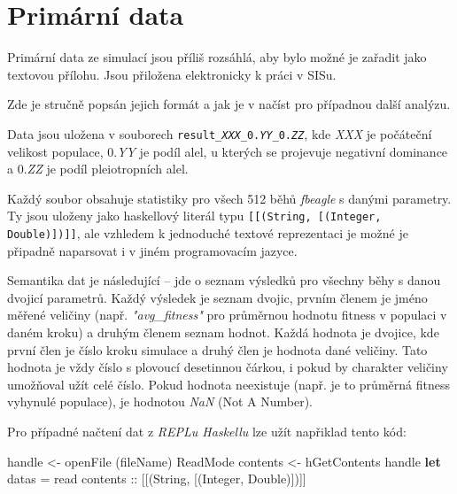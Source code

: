 \section{Primární data}
\label{sec:primarydata}

Primární data ze simulací jsou příliš rozsáhlá, aby bylo možné je zařadit jako textovou přílohu. Jsou přiložena elektronicky k práci v SISu.

Zde je stručně popsán jejich formát a jak je v načíst pro případnou další analýzu.

Data jsou uložena v souborech \texttt{result\_\textit{XXX}\_0.\textit{YY}\_0.\textit{ZZ}}, kde
\textit{XXX} je počáteční velikost populace,
0.\textit{YY} je podíl alel, u kterých se projevuje negativní dominance
a 0.\textit{ZZ} je podíl pleiotropních alel.

Každý soubor obsahuje statistiky pro všech 512 běhů \textit{fbeagle} s danými parametry. Ty jsou uloženy jako
haskellový literál typu \texttt{[[(String, [(Integer, Double)])]]}, ale vzhledem k jednoduché textové
reprezentaci je možné je připadně naparsovat i v jiném programovacím jazyce.

Semantika dat je následující -- jde o seznam výsledků pro všechny běhy s danou dvojicí parametrů. Každý výsledek
je seznam dvojic, prvním členem je jméno měřené veličiny (např. \textit{"avg\_fitness"} pro průměrnou hodnotu
fitness v populaci v daném kroku) a druhým členem seznam hodnot. Každá hodnota je dvojice, kde první člen je
číslo kroku simulace a druhý člen je hodnota dané veličiny. Tato hodnota je vždy číslo s plovoucí desetinnou čárkou,
i pokud by charakter veličiny umožňoval užít celé číslo. Pokud hodnota neexistuje (např. je to průměrná fitness vyhynulé
populace), je hodnotou \textit{NaN} (Not A Number).

Pro případné načtení dat z \textit{REPLu Haskellu} lze užít napřiklad tento kód:

\begin{code}[commandchars=\\\{\}]
handle <- openFile (fileName) ReadMode
contents <- hGetContents handle
\textbf{let}
        datas = read contents :: [[(String, [(Integer, Double)])]]
\end{code}
